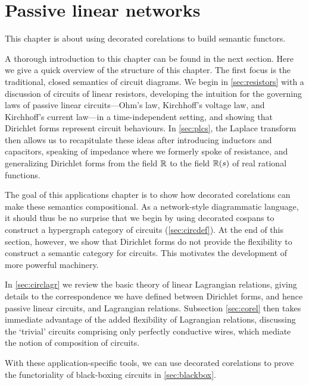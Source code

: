 \chapter{Passive linear networks} \label{ch.circuits}
This chapter is about using decorated corelations to build semantic functors.

A thorough introduction to this chapter can be found in the next section. Here
we give a quick overview of the structure of this chapter. The first focus is
the traditional, closed semantics of circuit diagrams. We begin in
\textsection\ref{sec:resistors} with a discussion of circuits of linear
resistors, developing the intuition for the governing laws of passive linear
circuits---Ohm's law, Kirchhoff's voltage law, and Kirchhoff's current law---in
a time-independent setting, and showing that Dirichlet forms represent circuit
behaviours.  In \textsection\ref{sec:plcs}, the Laplace transform then allows us
to recapitulate these ideas after introducing inductors and capacitors, speaking
of impedance where we formerly spoke of resistance, and generalizing Dirichlet
forms from the field ${\mathbb{R}}$ to the field ${\mathbb{R}}(s)$ of real rational functions. 

The goal of this applications chapter is to show how decorated corelations can
make these semantics compositional. As a network-style diagrammatic language, it
should thus be no surprise that we begin by using decorated cospans to construct
a hypergraph category of circuits (\textsection\ref{sec:circdef}). At the end of
this section, however, we show that Dirichlet forms do not provide the
flexibility to construct a semantic category for circuits.  This motivates the
development of more powerful machinery.

In \textsection\ref{sec:circlagr} we review the basic theory of linear
Lagrangian relations, giving details to the correspondence we have defined
between Dirichlet forms, and hence passive linear circuits, and Lagrangian
relations. Subsection \ref{sec:corel} then takes immediate advantage of the
added flexibility of Lagrangian relations, discussing the `trivial' circuits
comprising only perfectly conductive wires, which mediate the notion of
composition of circuits.

With these application-specific tools, we can use decorated corelations to prove
the functoriality of black-boxing circuits in \textsection\ref{sec:blackbox}.


